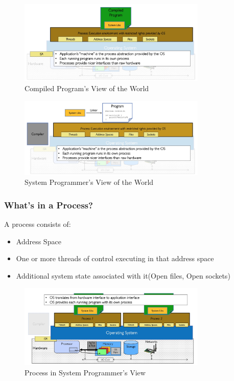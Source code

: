\begin{figure}[H]
    \centering
    \includegraphics[width = 0.8\textwidth ]{figures/Compiled Program's View of the World.jpg}
    \caption{Compiled Program's View of the World}
\end{figure}

\begin{figure}[H]
    \centering
    \includegraphics[width = 0.8\textwidth ]{figures/System Programmer's View of the World.jpg}
    \caption{System Programmer's View of the World}
\end{figure}
\subsubsection{What's in a Process?}
\noindent A process consists of:
\begin{itemize}
    \item Address Space
    \item One or more threads of control executing in that address space
    \item Additional system state associated with it(Open files, Open sockets)
\end{itemize}
\begin{figure}[H]
    \centering
    \includegraphics[width = 0.8\textwidth ]{figures/process_in_os_programmer_view.jpg}
    \caption{Process in System Programmer's View}
\end{figure}

